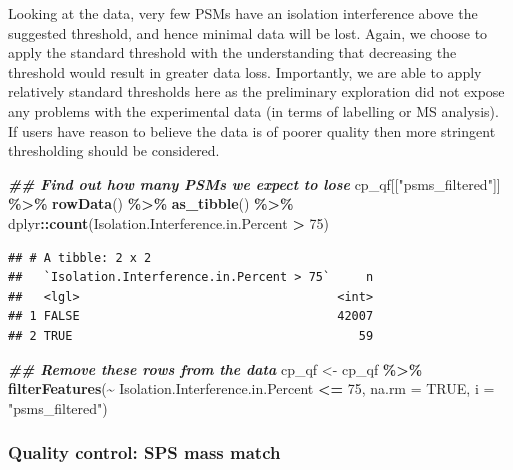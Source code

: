 \documentclass[9pt,a4paper,]{extarticle}
\newenvironment{Shaded}{\begin{snugshade}}{\end{snugshade}}
\newcommand{\AttributeTok}[1]{\textcolor[rgb]{0.13,0.29,0.53}{#1}}
\newcommand{\ConstantTok}[1]{\textcolor[rgb]{0.56,0.35,0.01}{#1}}
\newcommand{\DecValTok}[1]{\textcolor[rgb]{0.00,0.00,0.81}{#1}}
\newcommand{\DocumentationTok}[1]{\textcolor[rgb]{0.56,0.35,0.01}{\textbf{\textit{#1}}}}
\newcommand{\FunctionTok}[1]{\textcolor[rgb]{0.13,0.29,0.53}{\textbf{#1}}}
\newcommand{\NormalTok}[1]{#1}
\newcommand{\OtherTok}[1]{\textcolor[rgb]{0.56,0.35,0.01}{#1}}
\newcommand{\SpecialCharTok}[1]{\textcolor[rgb]{0.81,0.36,0.00}{\textbf{#1}}}
\newcommand{\StringTok}[1]{\textcolor[rgb]{0.31,0.60,0.02}{#1}}
\begin{document}
Looking at the data, very few PSMs have an isolation interference above the
suggested threshold, and hence minimal data will be lost. Again, we choose to
apply the standard threshold with the understanding that decreasing the
threshold would result in greater data loss. Importantly, we are able to apply
relatively standard thresholds here as the preliminary exploration did not
expose any problems with the experimental data (in terms of labelling or MS
analysis). If users have reason to believe the data is of poorer quality then
more stringent thresholding should be considered.

\begin{Shaded}
\begin{Highlighting}[]
\DocumentationTok{\#\# Find out how many PSMs we expect to lose}
\NormalTok{cp\_qf[[}\StringTok{"psms\_filtered"}\NormalTok{]] }\SpecialCharTok{\%\textgreater{}\%} 
  \FunctionTok{rowData}\NormalTok{() }\SpecialCharTok{\%\textgreater{}\%} 
  \FunctionTok{as\_tibble}\NormalTok{() }\SpecialCharTok{\%\textgreater{}\%} 
\NormalTok{  dplyr}\SpecialCharTok{::}\FunctionTok{count}\NormalTok{(Isolation.Interference.in.Percent }\SpecialCharTok{\textgreater{}} \DecValTok{75}\NormalTok{)}
\end{Highlighting}
\end{Shaded}

\begin{verbatim}
## # A tibble: 2 x 2
##   `Isolation.Interference.in.Percent > 75`     n
##   <lgl>                                    <int>
## 1 FALSE                                    42007
## 2 TRUE                                        59
\end{verbatim}

\begin{Shaded}
\begin{Highlighting}[]
\DocumentationTok{\#\# Remove these rows from the data}
\NormalTok{cp\_qf }\OtherTok{\textless{}{-}}\NormalTok{ cp\_qf }\SpecialCharTok{\%\textgreater{}\%}
  \FunctionTok{filterFeatures}\NormalTok{(}\SpecialCharTok{\textasciitilde{}}\NormalTok{ Isolation.Interference.in.Percent }\SpecialCharTok{\textless{}=} \DecValTok{75}\NormalTok{, }
                 \AttributeTok{na.rm =} \ConstantTok{TRUE}\NormalTok{,}
                 \AttributeTok{i =} \StringTok{"psms\_filtered"}\NormalTok{)}
\end{Highlighting}
\end{Shaded}

\hypertarget{quality-control-sps-mass-match}{%
\subsubsection{Quality control: SPS mass match}\label{quality-control-sps-mass-match}}
\end{document}

